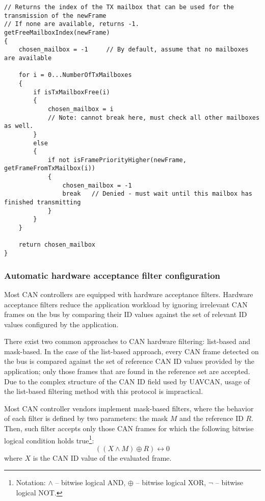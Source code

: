 \begin{minipage}{0.8\textwidth}
\begin{verbatim}
// Returns the index of the TX mailbox that can be used for the transmission of the newFrame
// If none are available, returns -1.
getFreeMailboxIndex(newFrame)
{
    chosen_mailbox = -1     // By default, assume that no mailboxes are available

    for i = 0...NumberOfTxMailboxes
    {
        if isTxMailboxFree(i)
        {
            chosen_mailbox = i
            // Note: cannot break here, must check all other mailboxes as well.
        }
        else
        {
            if not isFramePriorityHigher(newFrame, getFrameFromTxMailbox(i))
            {
                chosen_mailbox = -1
                break   // Denied - must wait until this mailbox has finished transmitting
            }
        }
    }

    return chosen_mailbox
}
\end{verbatim}
\end{minipage}

\subsubsection{Automatic hardware acceptance filter configuration}

Most CAN controllers are equipped with hardware acceptance filters.
Hardware acceptance filters reduce the application workload by ignoring irrelevant CAN frames on the bus
by comparing their ID values against the set of relevant ID values configured by the application.

There exist two common approaches to CAN hardware filtering:
list-based and mask-based.
In the case of the list-based approach, every CAN frame detected on the bus is compared
against the set of reference CAN ID values provided by the application;
only those frames that are found in the reference set are accepted.
Due to the complex structure of the CAN ID field used by UAVCAN,
usage of the list-based filtering method with this protocol is impractical.

Most CAN controller vendors implement mask-based filters,
where the behavior of each filter is defined by two parameters: the mask $M$ and the reference ID $R$.
Then, such filter accepts only those CAN frames for which the following bitwise logical condition holds
true\footnote{Notation: $\land$ -- bitwise logical AND, $\oplus$ -- bitwise logical XOR,
$\neg$ -- bitwise logical NOT.}:
$$((X \land M) \oplus R) \leftrightarrow 0$$
where $X$ is the CAN ID value of the evaluated frame.

